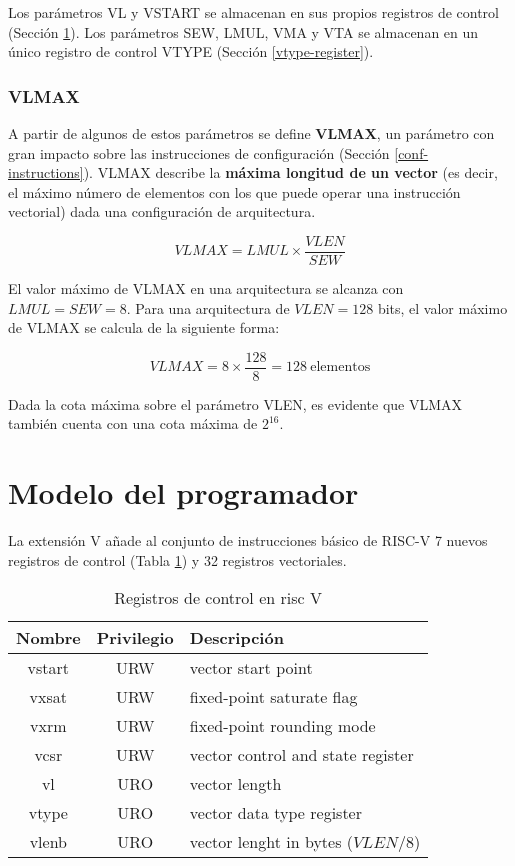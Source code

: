 Los parámetros VL y VSTART se almacenan en sus propios registros de control (Sección \ref{programmer-model}). Los parámetros SEW, LMUL, VMA y VTA se almacenan en un único registro de control VTYPE (Sección \ref{vtype-register}).

\subsubsection{VLMAX}\label{vlmax}
A partir de algunos de estos parámetros se define \textbf{VLMAX}, un parámetro con gran impacto sobre las instrucciones de configuración (Sección \ref{conf-instructions}). VLMAX describe la \textbf{máxima longitud de un vector} (es decir, el máximo número de elementos con los que puede operar una instrucción vectorial) dada una configuración de arquitectura.

$$VLMAX = LMUL \times \frac{VLEN}{SEW}$$

El valor máximo de VLMAX en una arquitectura se alcanza con $LMUL = SEW = 8$. Para una arquitectura de $VLEN = 128$ bits, el valor máximo de VLMAX se calcula de la siguiente forma: 

$$VLMAX = 8 \times \frac{128}{8} = 128~\text{elementos}$$

Dada la cota máxima sobre el parámetro VLEN, es evidente que VLMAX también cuenta con una cota máxima de $2^{16}$.

\section{Modelo del programador}\label{programmer-model}
La extensión V añade al conjunto de instrucciones básico de RISC-V 7 nuevos registros de control (Tabla \ref{control-regs}) y 32 registros vectoriales.

\begin{table}[H]
    \begin{tabular}{@{}ccl@{}}
        \toprule 
        Nombre & Privilegio & \phantom{~~~~~~~~~~~~~~~~}Descripción\\
        \midrule 
        vstart & URW\footnotemark[1] & vector start point\\
        vxsat  & URW & fixed-point saturate flag\\
        vxrm   & URW & fixed-point rounding mode\\
        vcsr   & URW & vector control and state register\\
        vl     & URO\footnotemark[2] & vector length\\
        vtype  & URO & vector data type register\\
        vlenb  & URO & vector lenght in bytes ($VLEN / 8$)\\
        \bottomrule 
    \end{tabular}
    \caption{Registros de control en risc V}
    \label{control-regs}
\end{table}

